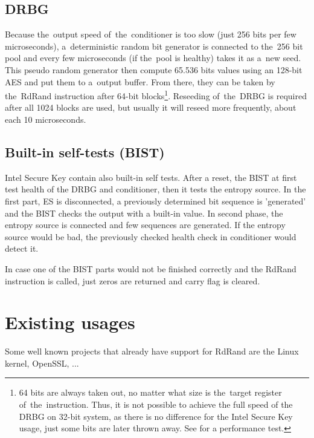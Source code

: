 \subsection{DRBG}\label{subsec:DRBG}
Because the~output speed of~the~conditioner is too slow (just 256 bits per few microseconds), a~deterministic random bit generator is connected to the~256 bit pool and every few microseconds (if the~pool is healthy) takes it as a~new seed. This pseudo random generator then compute 65.536 bits values using an 128-bit AES and put them to a~output buffer. From there, they can be taken by the~RdRand instruction after 64-bit blocks\footnote{64 bits are always taken out, no matter what size is the~target register of~the~instruction. Thus, it is not possible to achieve the full speed of the DRBG on 32-bit system, as there is no difference for the Intel Secure Key usage, just some bits are later thrown away. See  for a performance test.}\cite{AnalysisOfDRNG}\cite{UnderstandingRdRandElectronic}. Reseeding of~the~DRBG is required after all 1024 blocks are used, but usually it will reseed more frequently, about each 10 microseconds.

\subsection{Built-in self-tests (BIST)}
Intel Secure Key contain also built-in self tests. After a reset, the BIST at first test health of the DRBG and conditioner, then it tests the entropy source. In the first part, ES is disconnected, a previously determined bit sequence is 'generated' and the BIST checks the output with a built-in value. In second phase, the entropy source is connected and few sequences are generated. If the entropy source would be bad, the previously checked health check in conditioner would detect it. 

In case one of the BIST parts would not be finished correctly and the RdRand instruction is called, just zeros are returned and carry flag is cleared\cite{AnalysisOfDRNG}.

\section{Existing usages} 
Some well known projects that already have support for RdRand are the Linux kernel, OpenSSL, ...


